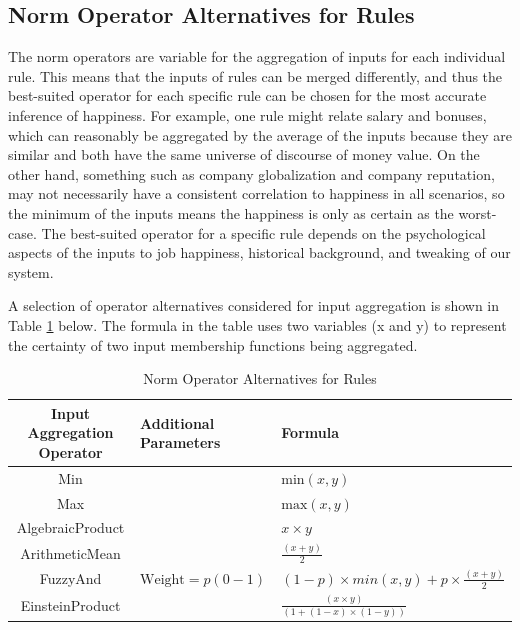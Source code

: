 \documentclass[12pt,fleqn,reqno,letterpaper]{article}
\begin{document}
\subsection{Norm Operator Alternatives for Rules}
The norm operators are variable for the aggregation of inputs for each individual rule. This means that the inputs of rules can be merged differently, and thus the best-suited operator for each specific rule can be chosen for the most accurate inference of happiness. For example, one rule might relate salary and bonuses, which can reasonably be aggregated by the average of the inputs because they are similar and both have the same universe of discourse of money value. On the other hand, something such as company globalization and company reputation, may not necessarily have a consistent correlation to happiness in all scenarios, so the minimum of the inputs means the happiness is only as certain as the worst-case. The best-suited operator for a specific rule depends on the psychological aspects of the inputs to job happiness, historical background, and tweaking of our system.

A selection of operator alternatives considered for input aggregation is shown in Table \ref{tbl:INPUT-AGGREGATION} below. The formula in the table uses two variables (x and y) to represent the certainty of two input membership functions being aggregated.

\begin{table}[H]
  \caption{Norm Operator Alternatives for Rules}
  \label{tbl:INPUT-AGGREGATION}
  \centering
\begin{tabular}{|c|l|l|}
\hline
\textbf{Input Aggregation Operator} & \textbf{Additional Parameters} & \textbf{Formula}                                      \\ \hline
Min                                 &                                & $\text{min}(x,y)$                                     \\ \hline
Max                                 &                                & $\text{max}(x,y)$                                     \\ \hline
AlgebraicProduct                    &                                & $x \times y$                                          \\ \hline
ArithmeticMean                      &                                & $\frac{(x+y)}{2}$                                 \\ \hline%
FuzzyAnd                            & $\text{Weight} = p (0-1)$      & $(1-p) \times min(x,y) + p \times \frac{(x+y)}{2}$ \\ \hline
EinsteinProduct                     &                                & $\frac{(x \times y)}{(1 + (1 - x)\times(1-y))}$       \\ \hline
\end{tabular}
\end{table}
\end{document}
